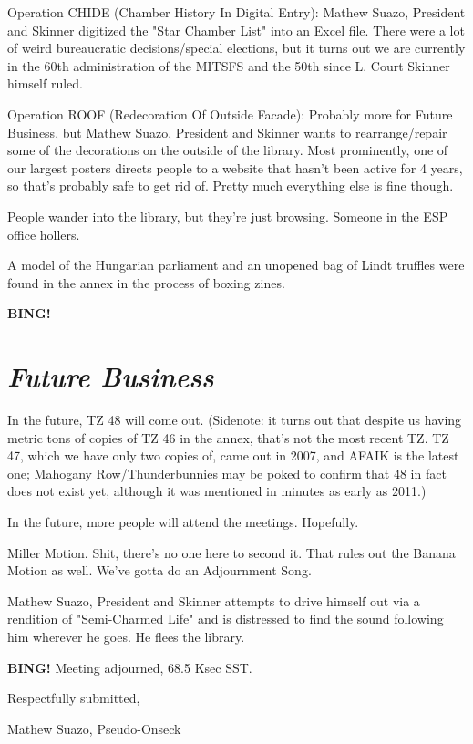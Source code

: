 \documentclass[10pt]{article}
\newcommand{\bing}{{\bf BING!} }
\newcommand{\goto}[1]{\bing \vskip 12pt \section*{{\em{#1}}}}
\newcommand{\skinner}{Mathew Suazo, President and Skinner }
\newcommand{\onseck}{Mathew Suazo, Pseudo-Onseck}
\begin{document}
Operation CHIDE (Chamber History In Digital Entry): \skinner digitized the "Star Chamber List" into an Excel file. There were a lot of weird bureaucratic decisions/special elections, but it turns out we are currently in the 60th administration of the MITSFS and the 50th since L. Court Skinner himself ruled.

Operation ROOF (Redecoration Of Outside Facade): Probably more for Future Business, but \skinner wants to rearrange/repair some of the decorations on the outside of the library. Most prominently, one of our largest posters directs people to a website that hasn't been active for 4 years, so that's probably safe to get rid of. Pretty much everything else is fine though.

People wander into the library, but they're just browsing. Someone in the ESP office hollers.

A model of the Hungarian parliament and an unopened bag of Lindt truffles were found in the annex in the process of boxing zines.

\goto{Future Business}

In the future, TZ 48 will come out. (Sidenote: it turns out that despite us having metric tons of copies of TZ 46 in the annex, that's not the most recent TZ. TZ 47, which we have only two copies of, came out in 2007, and AFAIK is the latest one; Mahogany Row/Thunderbunnies may be poked to confirm that 48 in fact does not exist yet, although it was mentioned in minutes as early as 2011.)

In the future, more people will attend the meetings. Hopefully.

Miller Motion. Shit, there's no one here to second it. That rules out the Banana Motion as well. We've gotta do an Adjournment Song.

\skinner attempts to drive himself out via a rendition of "Semi-Charmed Life" and is distressed to find the sound following him wherever he goes. He flees the library.

\bing
\noindent
Meeting adjourned, 68.5 Ksec SST.

\vspace{18pt}

\centerline{Respectfully submitted,}
\centerline{\onseck}
\end{document}
